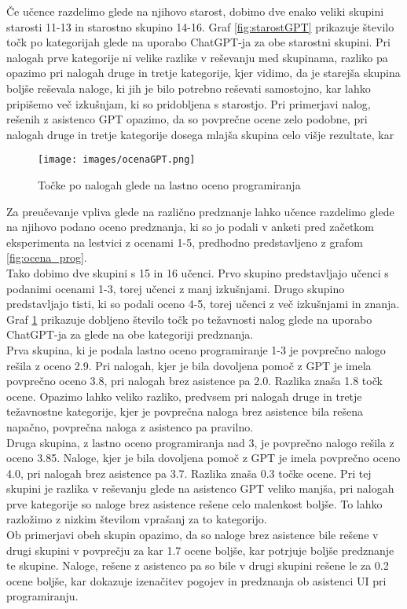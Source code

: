 \documentclass[a4paper,12pt,openright]{book}
\begin{document}
Če učence razdelimo glede na njihovo starost, dobimo dve enako veliki skupini starosti 11-13 in starostno skupino 14-16. Graf \ref{fig:starostGPT} prikazuje število točk po kategorijah glede na uporabo ChatGPT-ja za obe starostni skupini. Pri nalogah prve kategorije ni velike razlike v reševanju med skupinama, razliko pa opazimo pri nalogah druge in tretje kategorije, kjer vidimo, da je starejša skupina boljše reševala naloge, ki jih je bilo potrebno reševati samostojno, kar lahko pripišemo več izkušnjam, ki so pridobljena s starostjo. Pri primerjavi nalog, rešenih z asistenco GPT opazimo, da so povprečne ocene zelo podobne, pri nalogah druge in tretje kategorije dosega mlajša skupina celo višje rezultate, kar \\



\pagebreak

\begin{figure}[H]
    \centering
    \texttt{[image: images/ocenaGPT.png]}
    \caption{Točke po nalogah glede na lastno oceno programiranja}
    \label{fig:ocenaGPT}
\end{figure}

Za preučevanje vpliva glede na različno predznanje lahko učence razdelimo glede na njihovo podano oceno predznanja, ki so jo podali v anketi pred začetkom eksperimenta na lestvici z ocenami 1-5, predhodno predstavljeno z grafom \ref{fig:ocena_prog}. \\
Tako dobimo dve skupini s 15 in 16 učenci. Prvo skupino predstavljajo učenci s podanimi ocenami 1-3, torej učenci z manj izkušnjami. Drugo skupino predstavljajo tisti, ki so podali oceno 4-5, torej učenci z več izkušnjami in znanja. Graf \ref{fig:ocenaGPT} prikazuje dobljeno število točk po težavnosti nalog glede na uporabo ChatGPT-ja za glede na obe kategoriji predznanja. \\
Prva skupina, ki je podala lastno oceno programiranje 1-3 je povprečno nalogo rešila z oceno 2.9. Pri nalogah, kjer je bila dovoljena pomoč z GPT je imela povprečno oceno 3.8, pri nalogah brez asistence pa 2.0. Razlika znaša 1.8 točk ocene. Opazimo lahko veliko razliko, predvsem pri nalogah druge in tretje težavnostne kategorije, kjer je povprečna naloga brez asistence bila rešena napačno, povprečna naloga z asistenco pa pravilno. \\
Druga skupina, z lastno oceno programiranja nad 3, je povprečno nalogo rešila z oceno 3.85. Naloge, kjer je bila dovoljena pomoč z GPT je imela povprečno oceno 4.0, pri nalogah brez asistence pa 3.7. Razlika znaša 0.3 točke ocene. Pri tej skupini je razlika v reševanju glede na asistenco GPT veliko manjša, pri nalogah prve kategorije so naloge brez asistence rešene celo malenkost boljše. To lahko razložimo z nizkim številom vprašanj za to kategorijo. \\
Ob primerjavi obeh skupin opazimo, da so naloge brez asistence bile rešene v drugi skupini v povprečju za kar 1.7 ocene boljše, kar potrjuje boljše predznanje te skupine. Naloge, rešene z asistenco pa so bile v drugi skupini rešene le za 0.2 ocene boljše, kar dokazuje izenačitev pogojev in predznanja ob asistenci UI pri programiranju.
\end{document}
